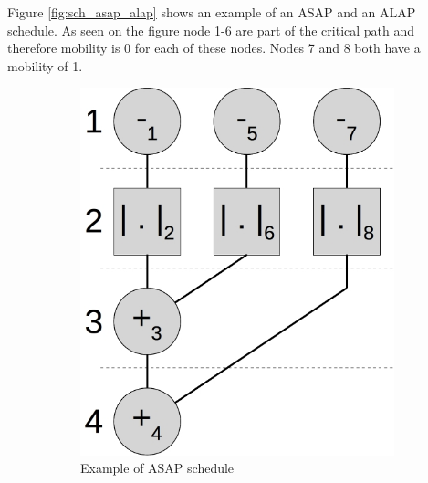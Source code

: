 Figure \vref{fig:sch_asap_alap} shows an example of an ASAP and an ALAP schedule. As seen on the figure node 1-6 are part of the critical path and therefore mobility is 0 for each of these nodes. Nodes 7 and 8 both have a mobility of 1. \\
\begin{figure}[ht]
  \centering
  \begin{subfigure}[t]{0.45\textwidth}
    \centering\includegraphics[scale=0.4]{figures/csadasap.jpg}
    \caption{Example of ASAP schedule\label{fig:sch_asap}}
  \end{subfigure}\hspace{0.5cm}
  \begin{subfigure}[t]{0.45\textwidth}

\end{subfigure}
\end{figure}
